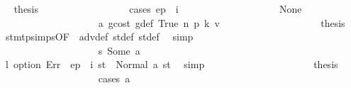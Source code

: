 \begin{isabellebody}
\ \isamarkupfalse%
\ {\isacharquery}{\kern0pt}thesis\isanewline
\ \ \ \ \ \ \ \ \ \ \ \ \ \ \ \ \isamarkupfalse%
\ {\isacharparenleft}{\kern0pt}cases\ {\isachardoublequoteopen}ep\ {\isachardollar}{\kern0pt}{\isachardollar}{\kern0pt}\ i{\isachardoublequoteclose}{\isacharparenright}{\kern0pt}\isanewline
\ \ \ \ \ \ \ \ \ \ \ \ \ \ \ \ \ \ \isamarkupfalse%
\ None\isanewline
\ \ \ \ \ \ \ \ \ \ \ \ \ \ \ \ \ \ \isamarkupfalse%
\ a{}\ gcost\ g{\isacharunderscore}{\kern0pt}def\ True\ n{}\ p{}\ k{}\ v{}\isanewline
\ \ \ \ \ \ \ \ \ \ \ \ \ \ \ \ \ \ \isamarkupfalse%
\ {\isacharquery}{\kern0pt}thesis\ \isamarkupfalse%
\ stmt{\isachardot}{\kern0pt}psimps{\isacharparenleft}{\kern0pt}{}{}{\isacharparenright}{\kern0pt}{\isacharbrackleft}{\kern0pt}OF\ {}{}{\isacharparenleft}{\kern0pt}{}{\isacharparenright}{\kern0pt}{\isacharbrackright}{\kern0pt}\ adv{\isacharunderscore}{\kern0pt}def\ st{\isacharprime}{\kern0pt}{\isacharunderscore}{\kern0pt}def\ st{\isacharprime}{\kern0pt}{\isacharprime}{\kern0pt}{\isacharunderscore}{\kern0pt}def\ \isamarkupfalse%
\ simp\isanewline
\ \ \ \ \ \ \ \ \ \ \ \ \ \ \ \ \isamarkupfalse%
\isanewline
\ \ \ \ \ \ \ \ \ \ \ \ \ \ \ \ \ \ \isamarkupfalse%
\ s{}{\isacharcolon}{\kern0pt}\ {\isacharparenleft}{\kern0pt}Some\ a{\isacharparenright}{\kern0pt}\isanewline
\ \ \ \ \ \ \ \ \ \ \ \ \ \ \ \ \ \ \isamarkupfalse%
\ \isamarkupfalse%
\ l{}{\isacharcolon}{\kern0pt}\ {\isachardoublequoteopen}option\ Err\ {\isacharparenleft}{\kern0pt}{\isasymlambda}{\isacharunderscore}{\kern0pt}{\isachardot}{\kern0pt}\ ep\ {\isachardollar}{\kern0pt}{\isachardollar}{\kern0pt}\ i{\isacharparenright}{\kern0pt}\ st{\isacharprime}{\kern0pt}{\isacharprime}{\kern0pt}\ {\isacharequal}{\kern0pt}\ Normal\ {\isacharparenleft}{\kern0pt}a{\isacharcomma}{\kern0pt}\ st{\isacharprime}{\kern0pt}{\isacharprime}{\kern0pt}{\isacharparenright}{\kern0pt}{\isachardoublequoteclose}\ \isamarkupfalse%
\ simp\isanewline
\ \ \ \ \ \ \ \ \ \ \ \ \ \ \ \ \ \ \isamarkupfalse%
\ \isamarkupfalse%
\ {\isacharquery}{\kern0pt}thesis\isanewline
\ \ \ \ \ \ \ \ \ \ \ \ \ \ \ \ \ \ \isamarkupfalse%
\ {\isacharparenleft}{\kern0pt}cases\ a{\isacharparenright}{\kern0pt}\isanewline
\ \ \ \ \ \ \ \ \ \ \ \ \ \ \ \ \ \ \ \ \isamarkupfalse%

\end{isabellebody}
